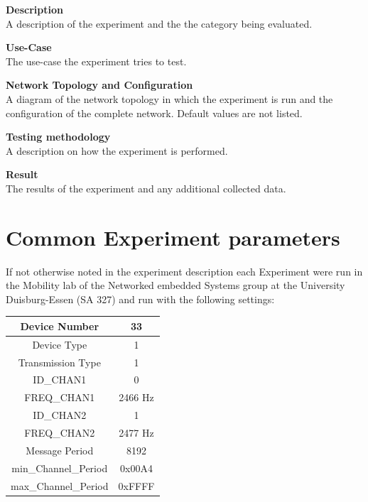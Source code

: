 \begin{description}
\item{\textbf{Description}} \hfill \\ A description of the experiment and the the category being evaluated.
\item{\textbf{Use-Case}} \hfill \\ The use-case the experiment tries to test.
\item{\textbf{Network Topology and Configuration}} \hfill \\ A diagram of the network topology in which the experiment is run and the configuration of the complete network. Default values are not listed.
\item{\textbf{Testing methodology}} \hfill \\ A description on how the experiment is performed.
\item{\textbf{Result}} \hfill \\ The results of the experiment and any additional collected data.
\end{description}

\newpage

\section{Common Experiment parameters}

If not otherwise noted in the experiment description each Experiment were run in the Mobility lab of the Networked embedded Systems group at the University Duisburg-Essen (SA 327) and run with the following settings:
\begin{center}
\begin{tabular}{|c|c|}
	\hline Device Number & 33 \\ 
	\hline Device Type & 1 \\ 
	\hline Transmission Type & 1 \\ 
	\hline ID\_CHAN1 & 0 \\ 
	\hline FREQ\_CHAN1 & 2466 Hz \\ 
	\hline ID\_CHAN2 & 1 \\ 
	\hline FREQ\_CHAN2 & 2477 Hz \\ 
	\hline Message Period & 8192 \\ 
	\hline min\_Channel\_Period & 0x00A4 \\ 
	\hline max\_Channel\_Period & 0xFFFF \\ 
	\hline 
\end{tabular} 		
\end{center}

